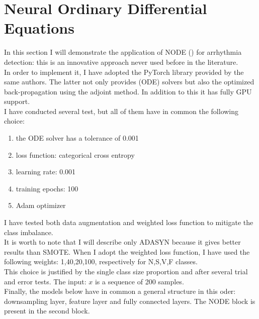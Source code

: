 \documentclass[LaM,binding=0.6cm]{sapthesis}
\begin{document}
\section{Neural Ordinary Differential Equations}
In this section I will demonstrate the application of NODE (\cite{DBLP:journals/corr/abs-1806-07366}) for arrhythmia detection: this is an innovative approach never used before in the literature.\\In order to implement it, I have adopted the PyTorch library provided by the same authors. The latter not only provides (ODE) solvers but also the optimized back-propagation using the adjoint method. In addition to this it has fully GPU support.\\I have conducted several test, but all of them have in common the following choice:
\begin{enumerate}
\item the ODE solver has a tolerance of 0.001
\item loss function: categorical cross entropy
\item learning rate: 0.001
\item training epochs: 100
\item Adam optimizer 
\end{enumerate}
I have tested both data augmentation and weighted loss function to mitigate the class imbalance.\\It is worth to note that I will describe only ADASYN because it gives better results than SMOTE. When I adopt the weighted loss function, I have used the following weights: 1,40,20,100, respectively for N,S,V,F classes.\\This choice is justified by the single class size proportion and after several trial and error tests. The input: $x$ is a sequence of 200 samples.\\Finally, the models below have in common a general structure in this oder: downsampling layer, feature layer and fully connected layers. The NODE block is present in the second block.
\end{document}
